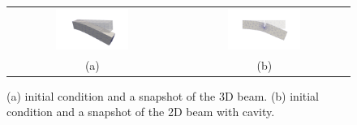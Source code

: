 \begin{figure}[t] \label{fig:0}
\begin{tabular}{cc}
\includegraphics[width=0.45\textwidth]{./figs/beam3d.png} & \includegraphics[width=0.45\textwidth]{./figs/beam2d.png} \\
(a) & (b)
\end{tabular}
\caption{(a) initial condition and a snapshot of the 3D beam. (b) initial condition and a snapshot of the 2D beam with cavity. }
\end{figure}

